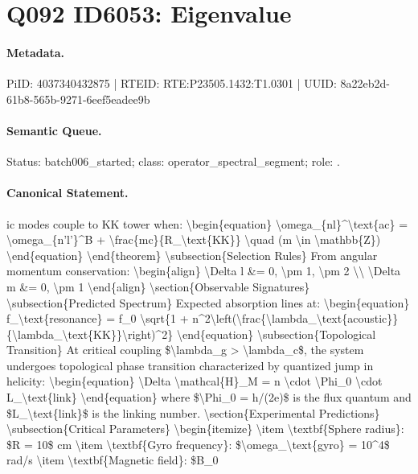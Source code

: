 \section*{Q092 ID6053: Eigenvalue}
\paragraph{Metadata.}
PiID: 4037340432875 | RTEID: RTE:P23505.1432:T1.0301 | UUID: 8a22eb2d-61b8-565b-9271-6eef5eadee9b

\paragraph{Semantic Queue.}
Status: batch006\_started; class: operator\_spectral\_segment; role: .

\paragraph{Canonical Statement.}
ic modes couple to KK tower when: \textbackslash{}begin\{equation\} \textbackslash{}omega\_\{nl\}\textasciicircum{}\textbackslash{}text\{ac\} = \textbackslash{}omega\_\{n'l'\}\textasciicircum{}B + \textbackslash{}frac\{mc\}\{R\_\textbackslash{}text\{KK\}\} \textbackslash{}quad (m \textbackslash{}in \textbackslash{}mathbb\{Z\}) \textbackslash{}end\{equation\} \textbackslash{}end\{theorem\} \textbackslash{}subsection\{Selection Rules\} From angular momentum conservation: \textbackslash{}begin\{align\} \textbackslash{}Delta l \&= 0, \textbackslash{}pm 1, \textbackslash{}pm 2 \textbackslash{}\textbackslash{} \textbackslash{}Delta m \&= 0, \textbackslash{}pm 1 \textbackslash{}end\{align\} \textbackslash{}section\{Observable Signatures\} \textbackslash{}subsection\{Predicted Spectrum\} Expected absorption lines at: \textbackslash{}begin\{equation\} f\_\textbackslash{}text\{resonance\} = f\_0 \textbackslash{}sqrt\{1 + n\textasciicircum{}2\textbackslash{}left(\textbackslash{}frac\{\textbackslash{}lambda\_\textbackslash{}text\{acoustic\}\}\{\textbackslash{}lambda\_\textbackslash{}text\{KK\}\}\textbackslash{}right)\textasciicircum{}2\} \textbackslash{}end\{equation\} \textbackslash{}subsection\{Topological Transition\} At critical coupling \$\textbackslash{}lambda\_g > \textbackslash{}lambda\_c\$, the system undergoes topological phase transition characterized by quantized jump in helicity: \textbackslash{}begin\{equation\} \textbackslash{}Delta \textbackslash{}mathcal\{H\}\_M = n \textbackslash{}cdot \textbackslash{}Phi\_0 \textbackslash{}cdot L\_\textbackslash{}text\{link\} \textbackslash{}end\{equation\} where \$\textbackslash{}Phi\_0 = h/(2e)\$ is the flux quantum and \$L\_\textbackslash{}text\{link\}\$ is the linking number. \textbackslash{}section\{Experimental Predictions\} \textbackslash{}subsection\{Critical Parameters\} \textbackslash{}begin\{itemize\} \textbackslash{}item \textbackslash{}textbf\{Sphere radius\}: \$R = 10\$ cm \textbackslash{}item \textbackslash{}textbf\{Gyro frequency\}: \$\textbackslash{}omega\_\textbackslash{}text\{gyro\} = 10\textasciicircum{}4\$ rad/s \textbackslash{}item \textbackslash{}textbf\{Magnetic field\}: \$B\_0


